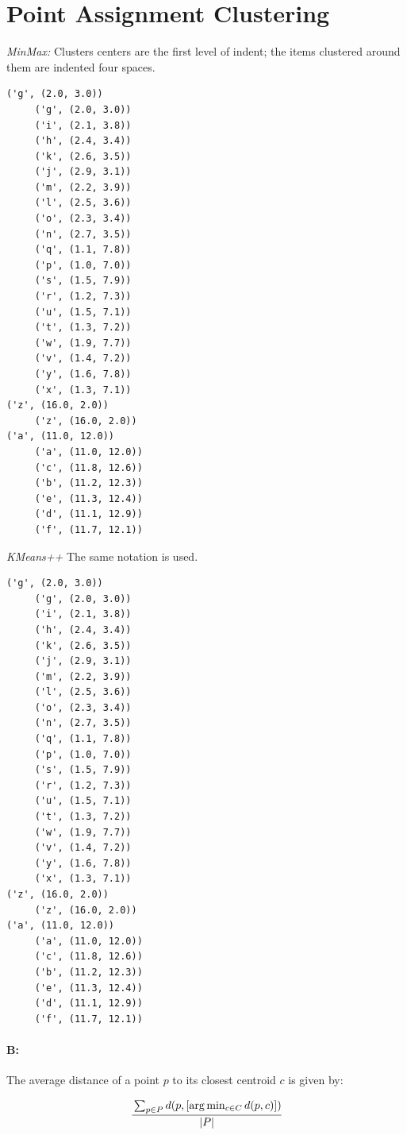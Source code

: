 \documentclass[11pt]{article}
\begin{document}
\section{Point Assignment Clustering}

\textit{MinMax:} Clusters centers are the first level of indent; the items clustered around them are indented four spaces.

\begin{verbatim}
('g', (2.0, 3.0))
     ('g', (2.0, 3.0))
     ('i', (2.1, 3.8))
     ('h', (2.4, 3.4))
     ('k', (2.6, 3.5))
     ('j', (2.9, 3.1))
     ('m', (2.2, 3.9))
     ('l', (2.5, 3.6))
     ('o', (2.3, 3.4))
     ('n', (2.7, 3.5))
     ('q', (1.1, 7.8))
     ('p', (1.0, 7.0))
     ('s', (1.5, 7.9))
     ('r', (1.2, 7.3))
     ('u', (1.5, 7.1))
     ('t', (1.3, 7.2))
     ('w', (1.9, 7.7))
     ('v', (1.4, 7.2))
     ('y', (1.6, 7.8))
     ('x', (1.3, 7.1))
('z', (16.0, 2.0))
     ('z', (16.0, 2.0))
('a', (11.0, 12.0))
     ('a', (11.0, 12.0))
     ('c', (11.8, 12.6))
     ('b', (11.2, 12.3))
     ('e', (11.3, 12.4))
     ('d', (11.1, 12.9))
     ('f', (11.7, 12.1))
\end{verbatim}

\textit{KMeans++} The same notation is used.

\begin{verbatim}
('g', (2.0, 3.0))
     ('g', (2.0, 3.0))
     ('i', (2.1, 3.8))
     ('h', (2.4, 3.4))
     ('k', (2.6, 3.5))
     ('j', (2.9, 3.1))
     ('m', (2.2, 3.9))
     ('l', (2.5, 3.6))
     ('o', (2.3, 3.4))
     ('n', (2.7, 3.5))
     ('q', (1.1, 7.8))
     ('p', (1.0, 7.0))
     ('s', (1.5, 7.9))
     ('r', (1.2, 7.3))
     ('u', (1.5, 7.1))
     ('t', (1.3, 7.2))
     ('w', (1.9, 7.7))
     ('v', (1.4, 7.2))
     ('y', (1.6, 7.8))
     ('x', (1.3, 7.1))
('z', (16.0, 2.0))
     ('z', (16.0, 2.0))
('a', (11.0, 12.0))
     ('a', (11.0, 12.0))
     ('c', (11.8, 12.6))
     ('b', (11.2, 12.3))
     ('e', (11.3, 12.4))
     ('d', (11.1, 12.9))
     ('f', (11.7, 12.1))
\end{verbatim}


\paragraph{B: }

The average distance of a point $p$ to its closest centroid $c$ is given by:

\begin{equation}
\cfrac{\sum_{p \in P} d(p, [ \arg \min_{c \in C} d(p,c)])}{|P|}
\end{equation}
\end{document}
